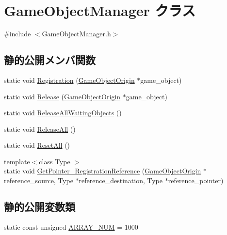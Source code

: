 \hypertarget{class_game_object_manager}{}\section{Game\+Object\+Manager クラス}
\label{class_game_object_manager}


{\ttfamily \#include $<$Game\+Object\+Manager.\+h$>$}

\subsection*{静的公開メンバ関数}
\begin{DoxyCompactItemize}
\item 
static void \mbox{\hyperlink{class_game_object_manager_ae8bbcddd70626ae7e8741050abb65977}{Registration}} (\mbox{\hyperlink{class_game_object_origin}{Game\+Object\+Origin}} $\ast$game\+\_\+object)
\item 
static void \mbox{\hyperlink{class_game_object_manager_aa3661e3da2a47c9b687ce253b4b7fca4}{Release}} (\mbox{\hyperlink{class_game_object_origin}{Game\+Object\+Origin}} $\ast$game\+\_\+object)
\item 
static void \mbox{\hyperlink{class_game_object_manager_ad3d2b61445d53ea23c5b19bc4e8958d8}{Release\+All\+Waiting\+Objects}} ()
\item 
static void \mbox{\hyperlink{class_game_object_manager_ac74e9da7077e89abc35fe86cf4a9ea23}{Release\+All}} ()
\item 
static void \mbox{\hyperlink{class_game_object_manager_a902c42587f383de65de07c132d51d27e}{Reset\+All}} ()
\item 
{\footnotesize template$<$class Type $>$ }\\static void \mbox{\hyperlink{class_game_object_manager_a035c39b0f483e65572c7bc027802aee9}{Get\+Pointer\+\_\+\+Registration\+Reference}} (\mbox{\hyperlink{class_game_object_origin}{Game\+Object\+Origin}} $\ast$reference\+\_\+source, Type $\ast$reference\+\_\+destination, Type $\ast$reference\+\_\+pointer)
\end{DoxyCompactItemize}
\subsection*{静的公開変数類}
\begin{DoxyCompactItemize}
\item 
static const unsigned \mbox{\hyperlink{class_game_object_manager_a591934d64d750c10c03c908371470681}{A\+R\+R\+A\+Y\+\_\+\+N\+UM}} = 1000
\end{DoxyCompactItemize}


